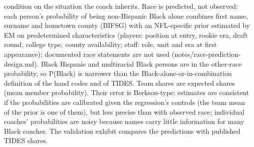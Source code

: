 {condition on the situation the coach inherits. Race is predicted, not observed: each person's probability of being non-Hispanic Black alone combines first name, surname and hometown county (BIFSG) with an NFL-specific prior estimated by EM on predetermined characteristics (players: position at entry, rookie era, draft round, college type, county availability; staff: role, unit and era at first appearance); documented race statements are not used (notes/race-prediction-design.md). Black Hispanic and multiracial Black persons are in the other-race probability, so P(Black) is narrower than the Black-alone-or-in-combination definition of the hand codes and of TIDES. Team shares are expected shares (mean member probability). Their error is Berkson-type: estimates are consistent if the probabilities are calibrated given the regression's controls (the team mean of the prior is one of them), but less precise than with observed race; individual coaches' probabilities are noisy because names carry little information for many Black coaches. The validation exhibit compares the predictions with published TIDES shares.
\par}

